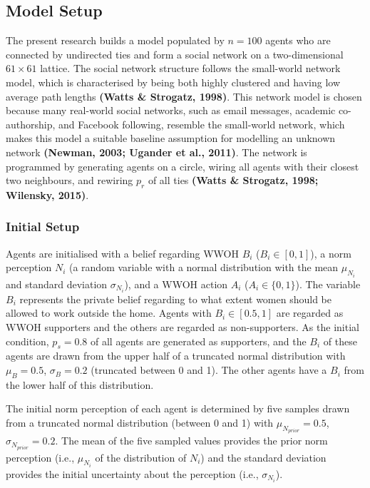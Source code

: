 \documentclass[
  11pt,
]{article}
\begin{document}
\hypertarget{model-setup}{%
\subsection{Model Setup}\label{model-setup}}

The present research builds a model populated by \(n = 100\) agents who
are connected by undirected ties and form a social network on a
two-dimensional \(61 \times 61\) lattice. The social network structure
follows the small-world network model, which is characterised by being
both highly clustered and having low average path lengths \textbf{(Watts
\& Strogatz, 1998)}. This network model is chosen because many
real-world social networks, such as email messages, academic
co-authorship, and Facebook following, resemble the small-world network,
which makes this model a suitable baseline assumption for modelling an
unknown network \textbf{(Newman, 2003; Ugander et al., 2011)}. The
network is programmed by generating agents on a circle, wiring all
agents with their closest two neighbours, and rewiring \(p_r\) of all
ties \textbf{(Watts \& Strogatz, 1998; Wilensky, 2015)}.

\hypertarget{initial-setup}{%
\subsubsection{Initial Setup}\label{initial-setup}}

Agents are initialised with a belief regarding WWOH \(B_i\)
(\(B_i \in [0, 1]\)), a norm perception \(N_i\) (a random variable with
a normal distribution with the mean \(\mu_{N_i}\) and standard deviation
\(\sigma_{N_i}\)), and a WWOH action \(A_i\) (\(A_i \in \{0, 1\}\)). The
variable \(B_i\) represents the private belief regarding to what extent
women should be allowed to work outside the home. Agents with
\(B_i \in [0.5, 1]\) are regarded as WWOH supporters and the others are
regarded as non-supporters. As the initial condition, \(p_s = 0.8\) of
all agents are generated as supporters, and the \(B_i\) of these agents
are drawn from the upper half of a truncated normal distribution with
\(\mu_B = 0.5\), \(\sigma_B = 0.2\) (truncated between 0 and 1). The
other agents have a \(B_i\) from the lower half of this distribution.

The initial norm perception of each agent is determined by five samples
drawn from a truncated normal distribution (between 0 and 1) with
\(\mu_{N_{prior}} = 0.5\), \(\sigma_{N_{prior}} = 0.2\). The mean of the
five sampled values provides the prior norm perception (i.e.,
\(\mu_{N_i}\) of the distribution of \(N_i\)) and the standard deviation
provides the initial uncertainty about the perception (i.e.,
\(\sigma_{N_i}\)).
\end{document}
